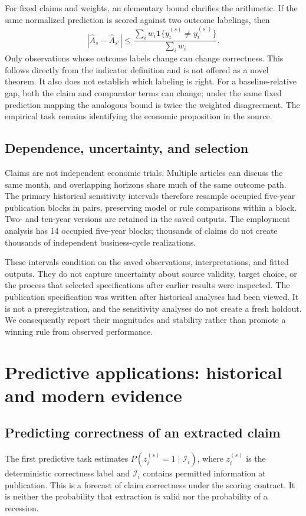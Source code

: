 \documentclass[iicol,pdflatex,sn-mathphys-num]{sn-jnl}
\begin{document}
For fixed claims and weights, an elementary bound clarifies the arithmetic. If the same normalized prediction is scored against two outcome labelings, then
\begin{equation}
 |\widehat A_s-\widehat A_{s'}|
 \leq \frac{\sum_i w_i\mathbf{1}\{y_i^{(s)}\neq y_i^{(s')}\}}{\sum_i w_i}.
 \label{eq:bound}
\end{equation}
Only observations whose outcome labels change can change correctness. This follows directly from the indicator definition and is not offered as a novel theorem. It also does not establish which labeling is right. For a baseline-relative gap, both the claim and comparator terms can change; under the same fixed prediction mapping the analogous bound is twice the weighted disagreement. The empirical task remains identifying the economic proposition in the source.

\subsection{Dependence, uncertainty, and selection}
Claims are not independent economic trials. Multiple articles can discuss the same month, and overlapping horizons share much of the same outcome path. The primary historical sensitivity intervals therefore resample occupied five-year publication blocks in pairs, preserving model or rule comparisons within a block. Two- and ten-year versions are retained in the saved outputs. The employment analysis has 14 occupied five-year blocks; thousands of claims do not create thousands of independent business-cycle realizations.

These intervals condition on the saved observations, interpretations, and fitted outputs. They do not capture uncertainty about source validity, target choice, or the process that selected specifications after earlier results were inspected. The publication specification was written after historical analyses had been viewed. It is not a preregistration, and the sensitivity analyses do not create a fresh holdout. We consequently report their magnitudes and stability rather than promote a winning rule from observed performance.

\section{Predictive applications: historical and modern evidence}
\subsection{Predicting correctness of an extracted claim}
The first predictive task estimates $P(z_i^{(s)}=1\mid\mathcal I_i)$, where $z_i^{(s)}$ is the deterministic correctness label and $\mathcal I_i$ contains permitted information at publication. This is a forecast of claim correctness under the scoring contract. It is neither the probability that extraction is valid nor the probability of a recession.
\end{document}
